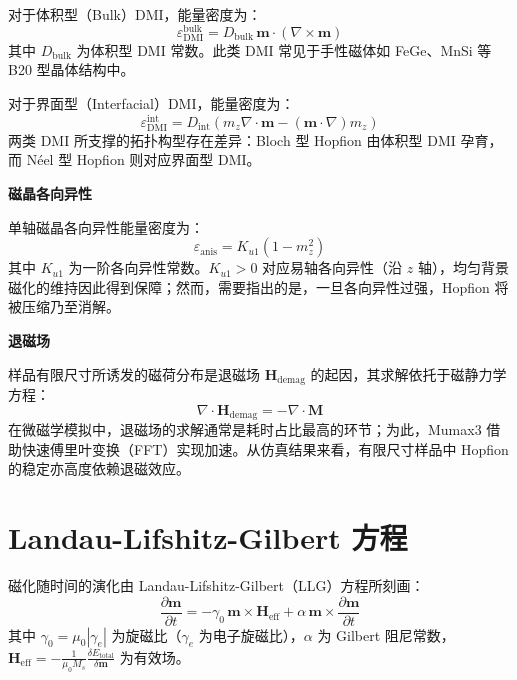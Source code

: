 对于体积型（Bulk）DMI，能量密度为：
\begin{equation}
  \varepsilon_{\text{DMI}}^{\text{bulk}} = D_{\text{bulk}} \, \mathbf{m} \cdot (\nabla \times \mathbf{m})
  \label{eq:dmi-bulk}
\end{equation}
其中 $D_{\text{bulk}}$ 为体积型 DMI 常数。此类 DMI 常见于手性磁体如 FeGe、MnSi 等 B20 型晶体结构中。

对于界面型（Interfacial）DMI，能量密度为：
\begin{equation}
  \varepsilon_{\text{DMI}}^{\text{int}} = D_{\text{int}} \left( m_z \nabla \cdot \mathbf{m} - (\mathbf{m} \cdot \nabla) m_z \right)
  \label{eq:dmi-int}
\end{equation}
两类 DMI 所支撑的拓扑构型存在差异：Bloch 型 Hopfion 由体积型 DMI 孕育，而 N\'{e}el 型 Hopfion 则对应界面型 DMI。

\par\noindent\textbf{磁晶各向异性}\par\nobreak

单轴磁晶各向异性能量密度为：
\begin{equation}
  \varepsilon_{\text{anis}} = K_{u1} (1 - m_z^2)
  \label{eq:anisotropy}
\end{equation}
其中 $K_{u1}$ 为一阶各向异性常数。$K_{u1} > 0$ 对应易轴各向异性（沿 $z$ 轴），均匀背景磁化的维持因此得到保障；然而，需要指出的是，一旦各向异性过强，Hopfion 将被压缩乃至消解。

\par\noindent\textbf{退磁场}\par\nobreak

样品有限尺寸所诱发的磁荷分布是退磁场 $\mathbf{H}_{\text{demag}}$ 的起因，其求解依托于磁静力学方程：
\begin{equation}
  \nabla \cdot \mathbf{H}_{\text{demag}} = -\nabla \cdot \mathbf{M}
  \label{eq:demag}
\end{equation}
在微磁学模拟中，退磁场的求解通常是耗时占比最高的环节；为此，Mumax3 借助快速傅里叶变换（FFT）实现加速。从仿真结果来看，有限尺寸样品中 Hopfion 的稳定亦高度依赖退磁效应。


\section{Landau-Lifshitz-Gilbert 方程}

磁化随时间的演化由 Landau-Lifshitz-Gilbert（LLG）方程所刻画：
\begin{equation}
  \frac{\partial \mathbf{m}}{\partial t} = -\gamma_0 \, \mathbf{m} \times \mathbf{H}_{\text{eff}} + \alpha \, \mathbf{m} \times \frac{\partial \mathbf{m}}{\partial t}
  \label{eq:llg}
\end{equation}
其中 $\gamma_0 = \mu_0 |\gamma_e|$ 为旋磁比（$\gamma_e$ 为电子旋磁比），$\alpha$ 为 Gilbert 阻尼常数，$\mathbf{H}_{\text{eff}} = -\frac{1}{\mu_0 M_s}\frac{\delta E_{\text{total}}}{\delta \mathbf{m}}$ 为有效场。


